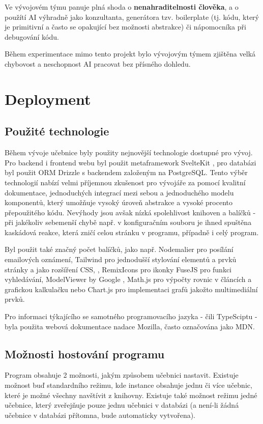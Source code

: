 \documentclass[12pt]{article}
\begin{document}
Ve vývojovém týmu panuje plná shoda o \textbf{nenahraditelnosti člověka}, a o použítí AI výhradně jako konzultanta, generátora tzv. boilerplate (tj. kódu, který je primitivní a často se opakující bez možnosti abstrakce) či nápomocníka při debugování kódu.

Během experimentace mimo tento projekt bylo vývojovým týmem zjištěna velká chybovost a neschopnost AI pracovat bez přísného dohledu.

\newpage
\section{Deployment}
\subsection{Použité technologie}

Během vývoje učebnice byly použity nejnovější technologie dostupné pro vývoj. Pro backend i frontend webu byl použit metaframework SvelteKit
\cite{Svelte}
, pro databázi byl použit ORM Drizzle s backendem založeným na PostgreSQL.
\cite{Drizzle} Tento výběr technologií nabízí velmi příjemnou zkušenost pro vývojáře za pomocí kvalitní dokumentace, jednoduchých integrací mezi sebou a jednoduchého modelu komponentů, který umožňuje vysoký úroveň abstrakce a vysoké procento přepoužitého kódu. Nevýhody jsou avšak nízká spolehlivost knihoven a balíčků - při jakékoliv sebemenší chybě např. v konfiguračním souboru je ihned spuštěna kaskádová reakce, která zničí celou stránku v programu, případně i celý program.

Byl použit také značný počet balíčků, jako např. Nodemalier pro posílání emailových oznámení, \cite{Nodemailer}
Tailwind pro jednodušší stylování elementů a prvků stránky a jako rozšíření CSS, \cite{Tailwind}, RemixIcons pro ikonky \cite{RemixIcons} FuseJS pro funkci vyhledávání,  \cite{FuseJS} ModelViewer by Google \cite{ModelViewer}, Math.js pro výpočty rovnic v článcích a grafickou kalkulačku \cite{MathJS}  nebo Chart.js \cite{ChartJS} pro implementaci grafů jakožto multimediální prvků.

Pro informaci týkajícího se samotného programovacího jazyka - čili TypeSciptu - byla použita webová dokumentace nadace Mozilla, často označována jako MDN. \cite{MDN}

\subsection{Možnosti hostování programu}
Program obsahuje 2 možnosti, jakým způsobem učebnici nastavit. Existuje možnost buď standardního režimu, kde instance obsahuje jednu či více učebnic, které je možné všechny navštívit z knihovny. Existuje také možnost režimu jedné učebnice, který zveřejňuje pouze jednu učebnici v databázi (a není-li žádná učebnice v databázi přítomna, bude automaticky vytvořena).
\end{document}
